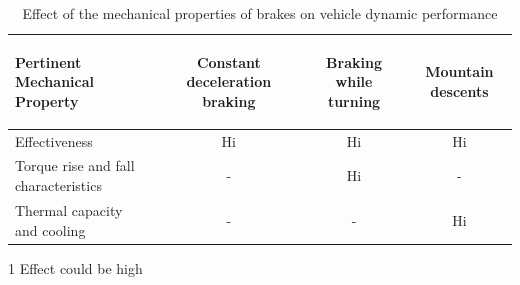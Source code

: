 \begin{table}[H]
	\centering\footnotesize
	\begin{threeparttable}
	
        \begin{tabulary}{\textwidth}{lccc}
            \toprule
            \textbf{Pertinent Mechanical Property} & \begin{sideways}\textbf{Constant deceleration braking}\end{sideways} & \begin{sideways}\textbf{Braking while turning}\end{sideways} & \begin{sideways}\textbf{Mountain descents}\end{sideways} \\\midrule
            Effectiveness & Hi    & Hi    & Hi \\
            Torque rise and fall characteristics & -     & Hi    & - \\
            Thermal capacity and cooling & -     & -     & Hi\\
            \bottomrule
		\end{tabulary}

		\caption{Effect of the mechanical properties of brakes on vehicle dynamic performance}
        \label{table:effect-of-the-mechanical-properties-of-brakes-on-vehicle-dynamic-performance}
        
        \begin{tablenotes}
            \item[1] Effect could be high
        \end{tablenotes}

	\end{threeparttable}
\end{table}

